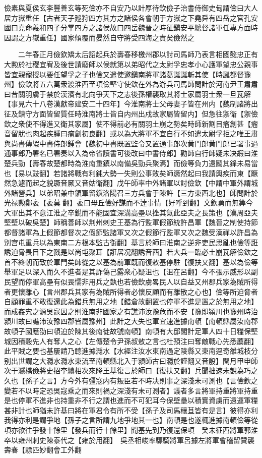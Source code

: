 儉素與夏侯玄李豐善玄等死儉亦不自安乃以計厚待欽儉子治書侍御史甸謂儉曰大人居方嶽重任【古者天子廵狩四方其方之諸侯各會朝于方嶽之下堯舜有四岳之官孔安國曰堯命羲和四子分掌四方之諸侯故曰四岳魏晉之時征鎭安平總督諸軍任專方面時因謂之方嶽重任】國家傾覆而晏然自守將受四海之責矣儉然之

　　二年春正月儉欽矯太后詔起兵於壽春移檄州郡以討司馬師乃表言相國懿忠正有大勲於社稷宜宥及後世請廢師以侯就第以弟昭代之太尉孚忠孝小心護軍望忠公親事皆宜親寵授以要任望孚之子也儉又遣使邀鎭南將軍諸葛誕誕斬其使【時誕都督豫州】儉欽將五六萬衆渡淮西至項儉堅守使欽在外為游兵司馬師問計於河南尹王肅肅曰昔關羽虜于禁於漢濱有北向爭天下之志後孫權襲取其將士家屬羽士衆一旦瓦解【事見六十八卷漢獻帝建安二十四年】今淮南將士父母妻子皆在州内【魏制諸將出征及鎮守方面皆留質任時淮南將士皆自内州出戍故家屬皆留内】但急往禦衛【禦儉欽之衆使不得進又衛其家屬】使不得前必有關羽土崩之勢矣時師新割目瘤創甚【瘤音留肬也肉起疾腫曰瘤創初良翻】或以為大將軍不宜自行不如遣太尉孚拒之唯王肅與尚書傳嘏中書侍郎鍾會【魏初中書既置監令又置通事郎次黄門郎黄門郎已署事過通事郎乃署名已署奏以入為帝省讀書可後改曰中書侍郎】勸師自行師疑未决嘏曰淮楚兵勁【壽春故楚都時為淮南重鎮以南備吳勁兵聚焉】而儉等負力遠鬭其鋒未易當也【易以豉翻】若諸將戰有利鈍大勢一失則公事敗矣師蹶然起曰我請輿疾而東【蹶然急遽而起之貌蹶音厥又音姑衛翻】戊午師率中外諸軍以討儉欽【中謂中軍外謂城外諸營兵】以弟昭兼中領軍留鎭洛陽召三方兵會于陳許【三方東西北也】師問計於光禄勲鄭袤【袤莫翻】袤曰毋丘儉好謀而不逹事情【好呼到翻】文欽勇而無筭今大軍出其不意江淮之卒鋭而不能固宜深溝高壘以挫其氣此亞夫之長策也【漢周亞夫堅壁以破吳楚】師稱善師以荆州刺史王基為行監軍假節統許昌軍【魏晉之制使持節都督諸軍為上假節都督次之假節監諸軍又次之假節行監軍又次之魏受漢禪以許昌為别宫屯重兵以為東南二方根本監古衘翻】基言於師曰淮南之逆非吏民思亂也儉等誑誘迫脅畏目下之戮是以尚屯聚耳【誑居况翻誘音酉】若大兵一臨必土崩瓦解儉欽之首不終朝而致於軍門矣師從之以基為前軍既而復敕基停駐【復扶又翻】基以為儉等舉軍足以深入而久不進者是其詐偽己露衆心疑沮也【沮在呂翻】今不張示威形以副民望而停軍高壘有似畏懦非用兵之埶也若儉欽虜畧民人以自益又州郡兵家為賊所得者更懷離心【言州郡兵其家有為賊所得者必懷反顧而有離散之心也】儉等所迫脅者自顧罪重不敢復還此為錯兵無用之地【錯倉故翻置也停軍不進是置之於無用之地】而成姦宄之源吳寇因之則淮南非國家之有譙沛汝豫危而不安【豫即潁川也豫州時治潁川故曰譙沛汝豫四郡皆屬豫州】此計之大失也軍宜速進據南頓【南頓縣屬汝南郡故頓子國應劭曰頓迫於陳其後南徙故號南頓】南頓有大邸閣計足軍人四十日糧保堅城因積穀先人有奪人之心【左傳楚令尹孫叔敖之言也杜預注曰奪敵戰心先悉薦翻】此平賊之要也基屢請乃聼進據㶏水【水經注汝水東南過定陵縣又東南逕奇雒城枝分别出世謂之大㶏水㶏水東流至南頓縣北入于潁師古曰㶏於謹翻又音殷】閏月甲申師次于㶏橋儉將史招李續相次來降王基復言於師曰【復扶又翻】兵聞拙速未覩為巧之久也【孫子之言】方今外有彊寇内有叛臣若不時决則事之深淺未可測也【言儉欽之變若不以時定恐吳寇乘之而來則禍之深淺有未可測者】議者多言將軍持重將軍持重是也停軍不進非也持重非不行之謂也進而不可犯耳今保壁壘以積實資虜而遠運軍糧甚非計也師猶未許基曰將在軍君令有所不受【孫子及司馬穰苴皆有是言】彼得亦利我得亦利是謂爭地【孫子之言所謂九地爭地其一也】南頓是也遂輒進據南頓儉等從項亦欲往爭發十餘里【發兵而行十餘里】聞基先到乃復還保項　癸未征西將軍郭淮卒以雍州刺史陳泰代之【雍於用翻】　吳丞相峻率驃騎將軍呂據左將軍會稽留贊襲壽春【驃匹妙翻會工外翻